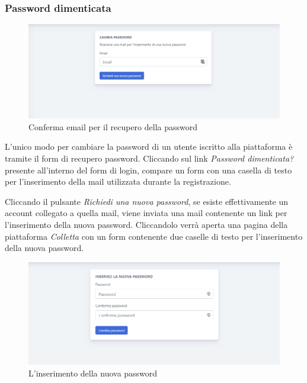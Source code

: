     \subsubsection{Password dimenticata}
    	\begin{figure}[H]
        	\centering
        	\includegraphics[width=1\linewidth]{sez/img/autenticazione/passwordDimenticata.png} 
        	\caption{Conferma email per il recupero della password}\label{fig:1}
    	\end{figure}
	L'unico modo per cambiare la password di un utente iscritto alla piattaforma è  tramite il form di recupero password. Cliccando sul link \textit{Password dimenticata?} presente all'interno del form di login, compare un form con una casella di testo per l'inserimento della mail utilizzata durante la registrazione. 
	
	Cliccando il pulsante \textit{Richiedi una nuova password}, se esiste effettivamente un account collegato a 	quella mail, viene inviata una mail contenente un link per l'inserimento della nuova password. Cliccandolo verrà aperta una pagina della piattaforma \textit{Colletta} con un form contenente due caselle di testo per l'inserimento della nuova password.
	
\begin{figure}[H]
        	\centering
        	\includegraphics[width=1\linewidth]{sez/img/autenticazione/password.png} 
        	\caption{L'inserimento della nuova password}\label{fig:1}
    	\end{figure}	

